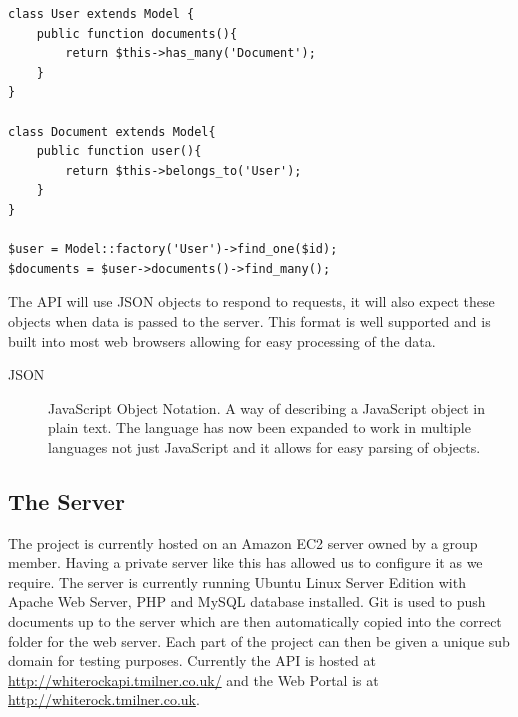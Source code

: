 \documentclass[11pt,a4paper]{article}
\begin{document}

\begin{lstlisting}[captionpos=b, caption=Model Snippet, label=lst:model, frame=single]
class User extends Model {
	public function documents(){
		return $this->has_many('Document');
	}
}

class Document extends Model{
	public function user(){
		return $this->belongs_to('User');
	}
}

$user = Model::factory('User')->find_one($id);
$documents = $user->documents()->find_many();
\end{lstlisting}

The API will use JSON objects to respond to requests, it will also expect these objects when data is passed to the server. This format is well supported and is built into most web browsers allowing for easy processing of the data.

\begin{description}
\item[JSON] JavaScript Object Notation. A way of describing a JavaScript object in plain text. The language has now been expanded to work in multiple languages not just JavaScript and it allows for easy parsing of objects.
\end{description}

\subsection{The Server}
\label{sec:techServer}
The project is currently hosted on an Amazon EC2 server owned by a group member. Having a private server like this has allowed us to configure it as we require. The server is currently running Ubuntu Linux Server Edition with Apache Web Server, PHP and MySQL database installed. Git is used to push documents up to the server which are then automatically copied into the correct folder for the web server. Each part of the project can then be given a unique sub domain for testing purposes. Currently the API is hosted at \url{http://whiterockapi.tmilner.co.uk/} and the Web Portal is at \url{http://whiterock.tmilner.co.uk}.
\end{document}
